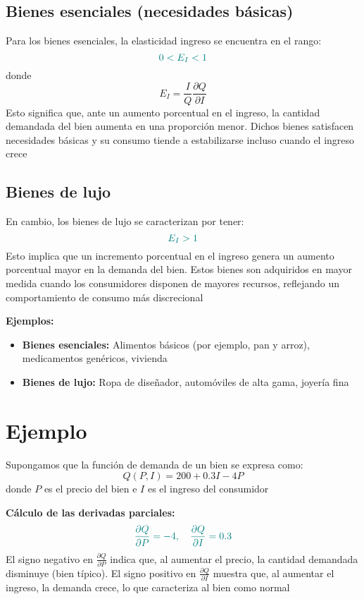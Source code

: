 \documentclass{article}
\begin{document}
\subsection*{Bienes esenciales (necesidades básicas)}

Para los bienes esenciales, la elasticidad ingreso se encuentra en el rango:
\[
\color{teal}
0 < E_I < 1
\]
donde
\[
E_I = \frac{I}{Q}\frac{\partial Q}{\partial I}
\]
Esto significa que, ante un aumento porcentual en el ingreso, la cantidad demandada del bien aumenta en una proporción menor. Dichos bienes satisfacen necesidades básicas y su consumo tiende a estabilizarse incluso cuando el ingreso crece

\subsection*{Bienes de lujo}

En cambio, los bienes de lujo se caracterizan por tener:
\[
\color{teal}
E_I > 1
\]
Esto implica que un incremento porcentual en el ingreso genera un aumento porcentual mayor en la demanda del bien. Estos bienes son adquiridos en mayor medida cuando los consumidores disponen de mayores recursos, reflejando un comportamiento de consumo más discrecional

\textbf{Ejemplos:}
\begin{itemize}
    \item \textbf{\color{teal}Bienes esenciales:} Alimentos básicos (por ejemplo, pan y arroz), medicamentos genéricos, vivienda
    \item \textbf{\color{teal}Bienes de lujo:} Ropa de diseñador, automóviles de alta gama, joyería fina
\end{itemize}

\section*{Ejemplo}

Supongamos que la función de demanda de un bien se expresa como:
\[
Q(P, I) = 200 + 0.3I - 4P
\]
donde \(P\) es el precio del bien e \(I\) es el ingreso del consumidor

\textbf{Cálculo de las derivadas parciales:}
\[
\color{teal}
\frac{\partial Q}{\partial P} = -4, \quad \frac{\partial Q}{\partial I} = 0.3
\]
El signo negativo en \(\frac{\partial Q}{\partial P}\) indica que, al aumentar el precio, la cantidad demandada disminuye (bien típico). El signo positivo en \(\frac{\partial Q}{\partial I}\) muestra que, al aumentar el ingreso, la demanda crece, lo que caracteriza al bien como normal
\end{document}

